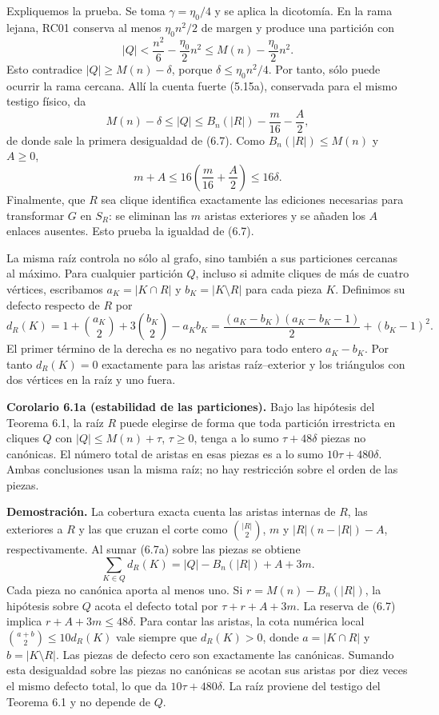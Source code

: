 \documentclass[spanish,11pt,a4paper]{article}
\begin{document}
Expliquemos la prueba. Se toma \(\gamma=\eta_0/4\) y se aplica la dicotomía. En la rama lejana, RC01 conserva al menos \(\eta_0n^2/2\) de margen y produce una partición con \[
|Q|<\frac{n^2}{6}-\frac{\eta_0}{2}n^2
\le M(n)-\frac{\eta_0}{2}n^2.
\] Esto contradice \(|Q|\ge M(n)-\delta\), porque \(\delta\le\eta_0n^2/4\). Por tanto, sólo puede ocurrir la rama cercana. Allí la cuenta fuerte (5.15a), conservada para el mismo testigo físico, da \[
M(n)-\delta\le |Q|
\le B_n(|R|)-\frac m{16}-\frac A2,
\] de donde sale la primera desigualdad de (6.7). Como \(B_n(|R|)\le M(n)\) y \(A\ge0\), \[
m+A\le16\left(\frac m{16}+\frac A2\right)\le16\delta.
\] Finalmente, que \(R\) sea clique identifica exactamente las ediciones necesarias para transformar \(G\) en \(S_R\): se eliminan las \(m\) aristas exteriores y se añaden los \(A\) enlaces ausentes. Esto prueba la igualdad de (6.7).

La misma raíz controla no sólo al grafo, sino también a sus particiones cercanas al máximo. Para cualquier partición \(Q\), incluso si admite cliques de más de cuatro vértices, escribamos \(a_K=|K\cap R|\) y \(b_K=|K\setminus R|\) para cada pieza \(K\). Definimos su defecto respecto de \(R\) por \[
d_R(K)=1+\binom{a_K}{2}+3\binom{b_K}{2}-a_Kb_K
=\frac{(a_K-b_K)(a_K-b_K-1)}2+(b_K-1)^2.
\tag{6.7a}
\] El primer término de la derecha es no negativo para todo entero \(a_K-b_K\). Por tanto \(d_R(K)=0\) exactamente para las aristas raíz--exterior y los triángulos con dos vértices en la raíz y uno fuera.


\textbf{Corolario 6.1a (estabilidad de las particiones).} Bajo las hipótesis del Teorema 6.1, la raíz \(R\) puede elegirse de forma que toda partición irrestricta en cliques \(Q\) con \(|Q|\le M(n)+\tau\), \(\tau\ge0\), tenga a lo sumo \(\tau+48\delta\) piezas no canónicas. El número total de aristas en esas piezas es a lo sumo \(10\tau+480\delta\). Ambas conclusiones usan la misma raíz; no hay restricción sobre el orden de las piezas.

\textbf{Demostración.} La cobertura exacta cuenta las aristas internas de \(R\), las exteriores a \(R\) y las que cruzan el corte como \(\binom{|R|}{2}\), \(m\) y \(|R|(n-|R|)-A\), respectivamente. Al sumar (6.7a) sobre las piezas se obtiene \[
\sum_{K\in Q}d_R(K)=|Q|-B_n(|R|)+A+3m.
\tag{6.7b}
\] Cada pieza no canónica aporta al menos uno. Si \(r=M(n)-B_n(|R|)\), la hipótesis sobre \(Q\) acota el defecto total por \(\tau+r+A+3m\). La reserva de (6.7) implica \(r+A+3m\le48\delta\). Para contar las aristas, la cota numérica local \(\binom{a+b}{2}\le10d_R(K)\) vale siempre que \(d_R(K)>0\), donde \(a=|K\cap R|\) y \(b=|K\setminus R|\). Las piezas de defecto cero son exactamente las canónicas. Sumando esta desigualdad sobre las piezas no canónicas se acotan sus aristas por diez veces el mismo defecto total, lo que da \(10\tau+480\delta\). La raíz proviene del testigo del Teorema 6.1 y no depende de \(Q\).
\end{document}
